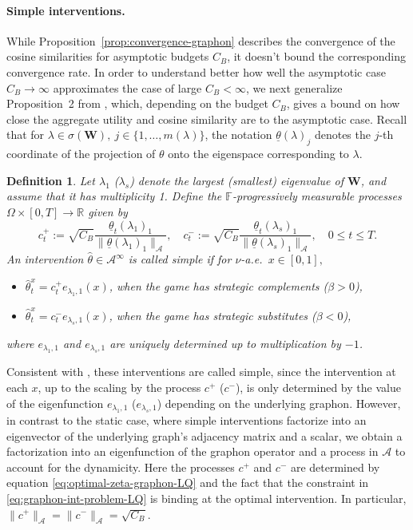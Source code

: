 \documentclass[11pt]{article}
\def\red#1{\textcolor{red}{#1}}
\newcommand{\R}{{\mathbb R}}
\newcommand{\F}{{\mathbb F}}
\newtheorem{definition}[theorem]{Definition}
\numberwithin{equation}{section}
\begin{document}
\paragraph{Simple interventions.}
While Proposition~\ref{prop:convergence-graphon} describes the convergence of the cosine similarities for asymptotic budgets $C_B$, it doesn't bound the corresponding convergence rate. In order to understand better how well the asymptotic case $C_B\to\infty$  approximates the case of large $C_B<\infty$, we next generalize Proposition~2 from \cite{galeotti2020targeting}, which, depending on the budget $C_B$, gives a bound on how close the aggregate utility and cosine similarity are to the asymptotic case. 
Recall that for $\lambda\in\sigma(\boldsymbol{W}),\ j\in\{1,\ldots, m(\lambda)\}$, the notation $\underline{\theta}(\lambda)_j$ denotes the $j$-th coordinate of the projection of $\theta$ onto the eigenspace corresponding to $\lambda$.

\begin{definition}
    Let $\lambda_1$ ($\lambda_{s}$) denote the largest (smallest) eigenvalue of $\boldsymbol{W}$, and assume that it has multiplicity 1. Define the $\F$-progressively measurable processes $\Omega\times[0,T]\to\R$ given by %
    $$
    c_t^+:=\sqrt{C_B}\frac{\underline{\theta}_t(\lambda_1)_1}{\|\underline{\theta}(\lambda_1)_1\|_{\mathcal{A}}},\quad 
    c_t^-:=\sqrt{C_B}\frac{\underline{\theta}_t(\lambda_{s})_1}{\|\underline{\theta}(\lambda_{s})_1\|_{\mathcal{A}}},\quad 0\leq t\leq T. 
    $$
    An intervention $\hat\theta\in\mathcal{A}^\infty$ is called simple if for $\nu$-a.e.~$x\in [0,1],$
    \begin{itemize}
    \item $\hat\theta^x_t=c_t^+e_{\lambda_1,1}(x)$, when the game has strategic complements ($\beta>0$),
    \item $\hat\theta^x_t=c^-_te_{\lambda_{s},1}(x)$, when the game has strategic substitutes ($\beta<0$),
    \end{itemize}
    where $e_{\lambda_{1},1}$ and $e_{\lambda_{s},1}$ are uniquely determined up to multiplication by $-1$.
\end{definition}
Consistent with \cite{galeotti2020targeting}, these interventions are called simple, since the intervention at each $x$, up to the scaling by the process $c^+$ ($c^-$), is only determined by the value of the eigenfunction $e_{\lambda_1,1}$ ($e_{\lambda_{s},1}$) depending on the underlying graphon. However, in contrast to the static case, where simple interventions factorize into an eigenvector of the underlying graph's adjacency matrix and a scalar, we obtain a factorization into an eigenfunction of the graphon operator and a process in $\mathcal{A}$ to account for the dynamicity.
Here the processes $c^+$ and $c^-$ are determined by equation \eqref{eq:optimal-zeta-graphon-LQ} and the fact that the constraint in \eqref{eq:graphon-int-problem-LQ} is binding at the optimal intervention. In particular, $\|c^+\|_{\mathcal{A}}=\|c^-\|_{\mathcal{A}}=\sqrt{C_B}$.
\end{document}
